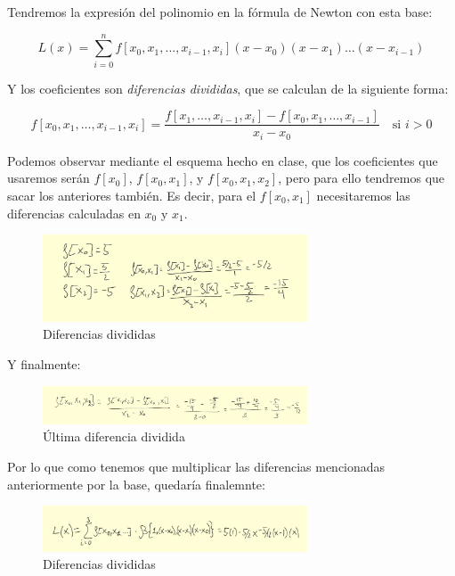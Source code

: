 \documentclass{article}
\begin{document}
Tendremos la expresión del polinomio en la fórmula de Newton con esta base:

\begin{equation}
L(x) = \sum_{i=0}^{n} f[x_0, x_1, \dots, x_{i-1}, x_i](x - x_0)(x - x_1) \dots (x - x_{i-1})
\end{equation}

Y los coeficientes son \textit{diferencias divididas}, que se calculan de la siguiente forma:

\begin{equation}
f[x_0, x_1, \dots, x_{i-1}, x_i] = \frac{f[x_1, \dots, x_{i-1}, x_i] - f[x_0, x_1, \dots, x_{i-1}]}{x_i - x_0} \quad \text{si } i > 0 
\end{equation}

Podemos observar mediante el esquema hecho en clase, que los coeficientes que usaremos serán $f[x_0]$, $f[x_0,x_1]$, y $f[x_0, x_1, x_2]$, pero para ello tendremos que sacar los anteriores también. Es decir, para el $f[x_0, x_1]$ necesitaremos las diferencias calculadas en $x_0$ y $x_1$.

\begin{figure}[h]
  \center
  \includegraphics[width=0.7\textwidth]{src/fxnewton.jpg}
  \caption{Diferencias divididas}
\end{figure}

Y finalmente:

\begin{figure}[h]
  \center
  \includegraphics[width=0.7\textwidth]{src/f012newton.jpg}
  \caption{Última diferencia dividida}
\end{figure}

Por lo que como tenemos que multiplicar las diferencias mencionadas anteriormente por la base, quedaría finalemnte:

\begin{figure}[h]
  \center
  \includegraphics[width=0.7\textwidth]{src/newtonsol1.jpg}
  \caption{Diferencias divididas}
\end{figure}
\end{document}
